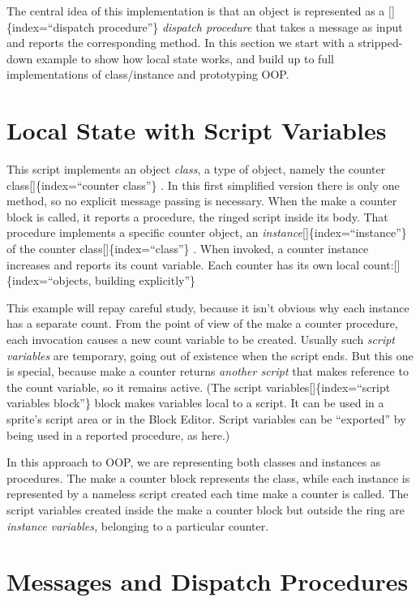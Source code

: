 \documentclass[
  letterpaper,
]{book}
\begin{document}
The central idea of this implementation is that an object is represented
as a {[}{]}\{index=``dispatch procedure''\} \emph{dispatch procedure}
that takes a message as input and reports the corresponding method. In
this section we start with a stripped-down example to show how local
state works, and build up to full implementations of class/instance and
prototyping OOP.

\section{Local State with Script
Variables}\label{local-state-with-script-variables}

This script implements an object \emph{class}, a type of object, namely
the counter class{[}{]}\{index=``counter class''\} . In this ﬁrst
simplified version there is only one method, so no explicit message
passing is necessary. When the make a counter block is called, it
reports a procedure, the ringed script inside its body. That procedure
implements a specific counter object, an
\emph{instance}{[}{]}\{index=``instance''\} of the counter
class{[}{]}\{index=``class''\} . When invoked, a counter instance
increases and reports its count variable. Each counter has its own local
count:{[}{]}\{index=``objects, building explicitly''\}

This example will repay careful study, because it isn't obvious why each
instance has a separate count. From the point of view of the make a
counter procedure, each invocation causes a new count variable to be
created. Usually such \emph{script variables} are temporary, going out
of existence when the script ends. But this one is special, because make
a counter returns \emph{another script} that makes reference to the
count variable, so it remains active. (The script
variables{[}{]}\{index=``script variables block''\} block makes
variables local to a script. It can be used in a sprite's script area or
in the Block Editor. Script variables can be ``exported'' by being used
in a reported procedure, as here.)

In this approach to OOP, we are representing both classes and instances
as procedures. The make a counter block represents the class, while each
instance is represented by a nameless script created each time make a
counter is called. The script variables created inside the make a
counter block but outside the ring are \emph{instance variables,}
belonging to a particular counter.

\section{Messages and Dispatch
Procedures}\label{messages-and-dispatch-procedures}
\end{document}
